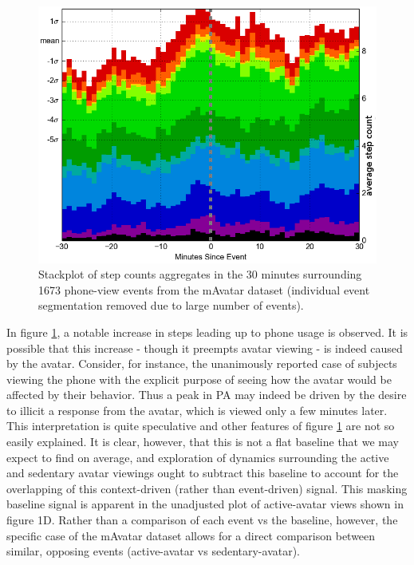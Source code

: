 \begin{figure}
\centering
\includegraphics[width=0.9\columnwidth]{./img/mAvatarViews_1673_wOverlap_noLines.png}
\caption{Stackplot of step counts aggregates in the 30 minutes surrounding 1673 phone-view events from the mAvatar dataset (individual event segmentation removed due to large number of events).}
\label{fig:mAvatarPhoneContext}
\end{figure}

In figure \ref{fig:mAvatarPhoneContext}, a notable increase in steps leading up to phone usage is observed.
It is possible that this increase - though it preempts avatar viewing - is indeed caused by the avatar.
Consider, for instance, the unanimously reported case of subjects viewing the phone with the explicit purpose of seeing how the avatar would be affected by their behavior.
Thus a peak in PA may indeed be driven by the desire to illicit a response from the avatar, which is viewed only a few minutes later.
This interpretation is quite speculative and other features of figure \ref{fig:mAvatarPhoneContext} are not so easily explained.
It is clear, however, that this is not a flat baseline that we may expect to find on average, and exploration of dynamics surrounding the active and sedentary avatar viewings ought to subtract this baseline to account for the overlapping of this context-driven (rather than event-driven) signal.
This masking baseline signal is apparent in the unadjusted plot of active-avatar views shown in figure 1D.
Rather than a comparison of each event vs the baseline, however, the specific case of the mAvatar dataset allows for a direct comparison between similar, opposing events (active-avatar vs sedentary-avatar).

